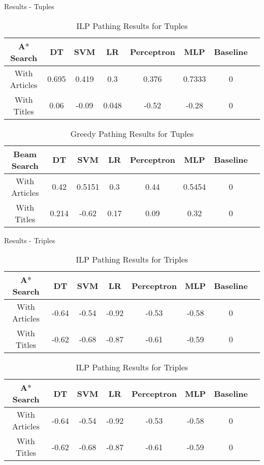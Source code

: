 \documentclass{beamer}
\begin{document}
\begin{tframe}{Results - Tuples}
\begin{table}[H]
\centering
\begin{tabular}{|c|c|c|c|c|c|c|c|}
  \hline
  A$*$ Search & DT & SVM &LR & Perceptron & MLP & Baseline\\
  \hline
With Articles & 0.695 & 0.419 & 0.3 & 0.376   & 0.7333  & 0\\
\hline
With Titles &0.06  & -0.09 & 0.048 & -0.52  & -0.28 & 0\\
\hline
\end{tabular}
\caption{ILP Pathing Results for Tuples}
\label{table:ILP-results}
\end{table}

\begin{table}[H]
\centering
\begin{tabular}{|c|c|c|c|c|c|c|c|}
  \hline
  Beam Search & DT & SVM &LR & Perceptron & MLP & Baseline\\
  \hline
With Articles & 0.42 & 0.5151 & 0.3 &  0.44  & 0.5454  & 0\\
\hline
With Titles & 0.214 & -0.62 & 0.17 & 0.09  & 0.32 & 0\\
\hline
\end{tabular}
\caption{Greedy Pathing Results for Tuples}
\label{table:greedy-results}
\end{table}

\end{tframe}
\begin{tframe}{Results - Triples}

\begin{table}[H]
\centering
\begin{tabular}{|c|c|c|c|c|c|c|c|}
  \hline
  A$*$ Search & DT & SVM &LR & Perceptron & MLP & Baseline\\
  \hline
With Articles & -0.64 & -0.54 & -0.92 & -0.53   & -0.58  & 0\\
\hline
With Titles & -0.62  & -0.68 & -0.87 & -0.61  & -0.59 & 0\\
\hline
\end{tabular}
\caption{ILP Pathing Results for Triples}
\label{table:ILP-results-triple}
\end{table}

\begin{table}[H]
\centering
\begin{tabular}{|c|c|c|c|c|c|c|c|}
  \hline
  A$*$ Search & DT & SVM &LR & Perceptron & MLP & Baseline\\
  \hline
With Articles & -0.64 & -0.54 & -0.92 & -0.53   & -0.58  & 0\\
\hline
With Titles & -0.62  & -0.68 & -0.87 & -0.61  & -0.59 & 0\\
\hline
\end{tabular}
\caption{ILP Pathing Results for Triples}
\label{table:ILP-results-triple}
\end{table}

\end{tframe}
\end{document}
